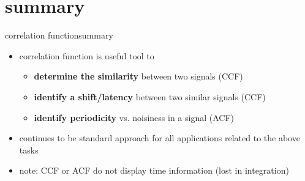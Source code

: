 \section{summary}
\begin{frame}{correlation function}{summary}
    \begin{itemize}
        \item   correlation function is useful tool to
            \begin{itemize}
                \item   \textbf{determine the similarity} between two signals (CCF)
                \item   \textbf{identify a shift/latency} between two similar signals (CCF)
                \item   \textbf{identify periodicity} vs. noisiness in a signal (ACF)
            \end{itemize}
        \smallskip
        \item<2->   continues to be standard approach for all applications related to the above tasks
        \smallskip
        \item<3->   note: CCF or ACF do not display time information (lost in integration)
    \end{itemize}
\end{frame}		

    


